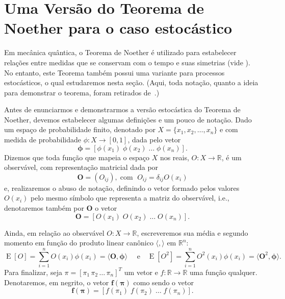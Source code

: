 \documentclass[twoside,openright,titlepage,numbers=noenddot,headinclude,  lineheaders footinclude=true,cleardoublepage=empty,
                                BCOR=5mm,paper=a4,fontsize=12pt ]{scrbook}
\theoremstyle{definition}
\DeclareMathOperator{\E}{E}
\begin{document}
\section{Uma Vers\~ao do  Teorema de Noether para o caso estoc\'astico}

Em mecânica quântica, o Teorema de Noether é utilizado para estabelecer
relações entre medidas que se conservam com o tempo e suas simetrias
(vide \cite{noether}).  
No entanto, este Teorema também possui uma variante 
para processos estocásticos, o qual estudaremos nesta seção. %
(Aqui, toda notação, quanto a ideia para demonstrar
o teorema, foram retirados de~\cite{noether}.)


Antes de enunciarmos e demonstrarmos a versão estocástica do Teorema de Noether, devemos estabelecer algumas definições e
um pouco de notação. Dado um espaço de probabilidade finito, denotado
por $X = \{ x_1, x_2, \ldots, x_n \}$ e com medida de probabilidade
$\phi: X \rightarrow [0,1]$, dada pelo vetor
\[
\bm{\phi} = [ \phi(x_1) \; \phi(x_2) \;\ldots\; \phi(x_n) ].
\]
Dizemos que toda  função que mapeia
o espaço $X$ nos reais,  $O: X \rightarrow \mathbb{R}$, é um observável, 
com representação matricial dada por
\[
\bm{O} = (O_{ij}), \;
\text{com } \;
O_{ij} = \delta_{ij} O(x_i)
\]
e,
realizaremos o abuso de notação, definindo o vetor formado
pelos valores $O(x_i)$ pelo mesmo símbolo que representa a matriz
do observável, i.e., denotaremos também
por $\bm{O}$ o vetor
\[
\bm{O} = [ O(x_1) \; O(x_2) \;\ldots\; O(x_n) ].
\]

Ainda, em relação ao observável $O: X \rightarrow \mathbb{R}$, 
 escreveremos sua média e segundo momento em 
função do produto linear canônico $\langle, \rangle$ em $\mathbb{R}^n$: 
\[
\E[O] = \sum_{i=1}^{n} O(x_i) \phi(x_i) = \langle \bm{O}, \bm{\phi} \rangle
\quad \text{ e} \quad
\E[O^2] = \sum_{i=1}^{n} O^2(x_i) \phi(x_i) = \langle \bm{O}^2, \bm{\phi} \rangle.
\]
Para finalizar, seja $\pi = [\pi_1 \, 
\pi_2 \, \ldots \, \pi_n]^T$ um vetor e $f: 
\mathbb{R} \rightarrow \mathbb{R}$ uma função qualquer. Denotaremos,
em negrito, o vetor $\bm{f(\pi)}$ como sendo o vetor
\[
\bm{f(\pi)} = [ f(\pi_1) \; f(\pi_2) \;\ldots\; f(\pi_n) ].
\]
\end{document}
